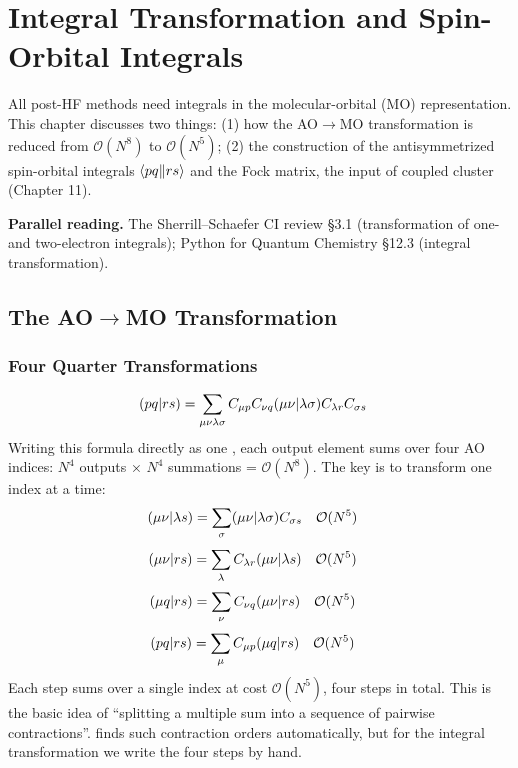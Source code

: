 \chapter{Integral Transformation and Spin-Orbital Integrals}
\label{ch:integrals}

All post-HF methods need integrals in the molecular-orbital (MO) representation. This chapter discusses two things: (1) how the AO$\to$MO transformation is reduced from $\mathcal{O}(N^8)$ to $\mathcal{O}(N^5)$; (2) the construction of the antisymmetrized spin-orbital integrals $\langle pq\Vert rs\rangle$ and the Fock matrix, the input of coupled cluster (Chapter 11).

\textbf{Parallel reading.} The Sherrill--Schaefer CI review §3.1 (transformation of one- and two-electron integrals); Python for Quantum Chemistry §12.3 (integral transformation).

\section{The AO$\to$MO Transformation}

\subsection{Four Quarter Transformations}

\begin{align*}
(pq\vert rs) &= \sum_{\mu \nu \lambda \sigma} C_{\mu p} C_{\nu q} (\mu \nu\vert \lambda \sigma) C_{\lambda r} C_{\sigma s}
\end{align*}
Writing this formula directly as one , each output element sums over four AO indices: $N^4$ outputs × $N^4$ summations = $\mathcal{O}(N^8)$. The key is to transform one index at a time:
\begin{align*}
(\mu \nu\vert \lambda s) &= \sum_{\sigma} (\mu \nu\vert \lambda \sigma) C_{\sigma s} \quad \mathcal{O}(N^5)
\end{align*}
\begin{align*}
(\mu \nu\vert r s) &= \sum_{\lambda} C_{\lambda r} (\mu \nu\vert \lambda s) \quad \mathcal{O}(N^5)
\end{align*}
\begin{align*}
(\mu q\vert r s) &= \sum_{\nu} C_{\nu q} (\mu \nu\vert r s) \quad \mathcal{O}(N^5)
\end{align*}
\begin{align*}
(p q\vert r s) &= \sum_{\mu} C_{\mu p} (\mu q\vert r s) \quad \mathcal{O}(N^5)
\end{align*}
Each step sums over a single index at cost $\mathcal{O}(N^5)$, four steps in total. This is the basic idea of ``splitting a multiple sum into a sequence of pairwise contractions''.  finds such contraction orders automatically, but for the integral transformation we write the four steps by hand.

